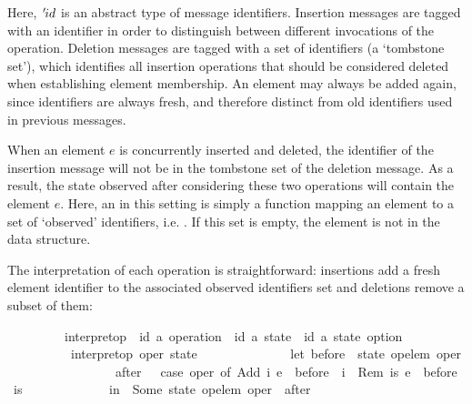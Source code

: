 \noindent Here, ${\emph{$\mskip2mu{'}\mskip-2mu$}}id$ is an abstract type of message identifiers.
Insertion messages are tagged with an identifier in order to distinguish between different invocations of the operation.
Deletion messages are tagged with a set of identifiers (a `tombstone set'), which identifies all insertion operations that should be considered deleted when establishing element membership.
An element may always be added again, since identifiers are always fresh, and therefore distinct from old identifiers used in previous messages.

When an element $e$ is concurrently inserted and deleted, the identifier of the insertion message will not be in the tombstone set of the deletion message.
As a result, the state observed after considering these two operations will contain the element $e$.
Here, an  in this setting is simply a function mapping an element to a set of `observed' identifiers, i.e. .
If this set is empty, the element is not in the data structure.

The interpretation of each operation is straightforward: insertions add a fresh element identifier to the associated observed identifiers set and deletions remove a subset of them:

\vspace{0.35em}
\begin{isabellebody}
\ \ \ \ \ \ \ \ \ interpret{\isacharunderscore}op\ {\isacharcolon}{\isacharcolon}\ {\isachardoublequoteopen}{\isacharparenleft}{\isacharprime}id{\isacharcomma}\ {\isacharprime}a{\isacharparenright}\ operation\ {\isasymRightarrow}\ {\isacharparenleft}{\isacharprime}id{\isacharcomma}\ {\isacharprime}a{\isacharparenright}\ state\ {\isasymRightarrow}\ {\isacharparenleft}{\isacharprime}id{\isacharcomma}\ {\isacharprime}a{\isacharparenright}\ state\ option{\isachardoublequoteclose}\ {\isacharparenleft}{\isachardoublequoteopen}{\isasymlangle}{\isacharunderscore}{\isasymrangle}{\isachardoublequoteclose}\ {\isacharbrackleft}{}{\isacharbrackright}\ {}{}{}{}{\isacharparenright}\ \isanewline
\ \ \ \ \ \ \ \ \ \ {\isachardoublequoteopen}interpret{\isacharunderscore}op\ oper\ state\ {\isasymequiv}\isanewline
\ \ \ \ \ \ \ \ \ \ \ \ \ let\ before\ {\isacharequal}\ state\ {\isacharparenleft}op{\isacharunderscore}elem\ oper{\isacharparenright}{\isacharsemicolon}\isanewline
\ \ \ \ \ \ \ \ \ \ \ \ \ \ \ \ \ after\ \ {\isacharequal}\ case\ oper\ of\ Add\ i\ e\ {\isasymRightarrow}\ before\ {\isasymunion}\ {\isacharbraceleft}i{\isacharbraceright}\ {\isacharbar}\ Rem\ is\ e\ {\isasymRightarrow}\ before\ {\isacharminus}\ is\isanewline
\ \ \ \ \ \ \ \ \ \ \ \ \ in\ \ Some\ {\isacharparenleft}state\ {\isacharparenleft}{\isacharparenleft}op{\isacharunderscore}elem\ oper{\isacharparenright}\ {\isacharcolon}{\isacharequal}\ after{\isacharparenright}{\isacharparenright}{\isachardoublequoteclose}
\end{isabellebody}
\vspace{0.35em}

